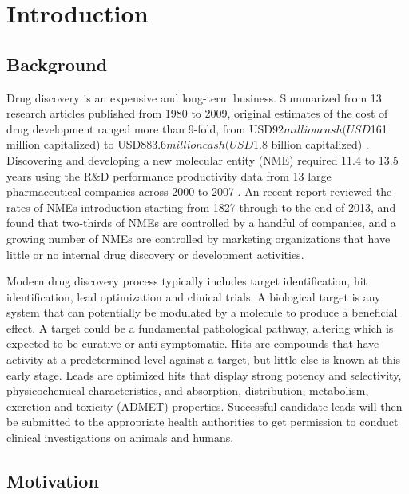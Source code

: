 \chapter{Introduction}

\section{Background}

Drug discovery is an expensive and long-term business. Summarized from 13 research articles published from 1980 to 2009, original estimates of the cost of drug development ranged more than 9-fold, from USD$92 million cash (USD$161 million capitalized) to USD$883.6 million cash (USD$1.8 billion capitalized) \citep{1431}. Discovering and developing a new molecular entity (NME) required 11.4 to 13.5 years using the R\&D performance productivity data from 13 large pharmaceutical companies across 2000 to 2007 \citep{716}. An recent report \citep{1427} reviewed the rates of NMEs introduction starting from 1827 through to the end of 2013, and found that two-thirds of NMEs are controlled by a handful of companies, and a growing number of NMEs are controlled by marketing organizations that have little or no internal drug discovery or development activities.

Modern drug discovery process typically includes target identification, hit identification, lead optimization and clinical trials. A biological target is any system that can potentially be modulated by a molecule to produce a beneficial effect. A target could be a fundamental pathological pathway, altering which is expected to be curative or anti-symptomatic. Hits are compounds that have activity at a predetermined level against a target, but little else is known at this early stage. Leads are optimized hits that display strong potency and selectivity, physicochemical characteristics, and absorption, distribution, metabolism, excretion and toxicity (ADMET) properties. Successful candidate leads will then be submitted to the appropriate health authorities to get permission to conduct clinical investigations on animals and humans.

\section{Motivation}

